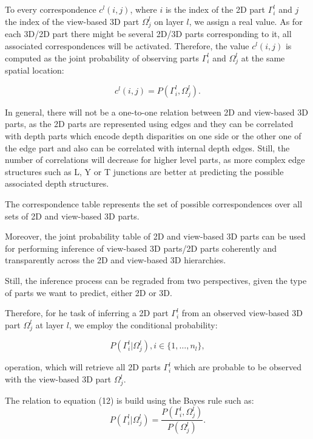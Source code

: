 \documentclass[runningheads]{llncs}
\begin{document}
To every correspondence $c^l(i,j)$, where $i$ is the index of the 2D part $\Gamma_i^l$ and $j$ the index of the view-based 3D part $\Omega_j^l$ on layer $l$, we assign a real value. As for each 3D/2D part there might be several 2D/3D parts corresponding to it, all associated correspondences will be activated. Therefore, the value $c^l(i,j)$ is computed as the joint probability of observing parts $\Gamma_i^l$ and $\Omega_j^l$ at the same spatial location:

\begin{equation}
  c^l(i,j) = P(\Gamma_i^l,\Omega_j^l). 
 \end{equation} 

In general, there will not be a one-to-one relation between 2D and view-based 3D parts, as the 2D parts are represented using edges and they can be correlated with depth parts which encode depth disparities on one side or the other one of the edge part and also can be correlated with internal depth edges. Still, the number of correlations will decrease for higher level parts, as more complex edge structures such as L, Y or T junctions are better at predicting the possible associated depth structures.

The correspondence table represents the set of possible correspondences over all sets of 2D and view-based 3D parts.  

Moreover, the joint probability table of 2D and view-based 3D parts can be used for performing inference of view-based 3D parts/2D parts coherently and transparently across the 2D and view-based 3D hierarchies.

Still, the inference process can be regraded from two perspectives, given the type of parts we want to predict, either 2D or 3D. 

Therefore, for he task of inferring a 2D part $\Gamma_i^l$ from an observed view-based 3D part $\Omega_j^l$ at layer $l$, we employ the conditional probability:

\begin{equation}
P(\Gamma_i^l \vert \Omega_j^l), i \in \{1,\dots,n_l\},
\end{equation}

operation, which will retrieve all 2D parts $\Gamma_i^l$ which are probable to be observed with the view-based 3D part $\Omega_j^l$. 

The relation to equation (12) is build using the Bayes rule such as:
\begin{equation}
P(\Gamma_i^l \vert \Omega_j^l)= \frac{P(\Gamma_i^l,\Omega_j^l)}{P(\Omega_j^l)}.
\end{equation}
\end{document}
